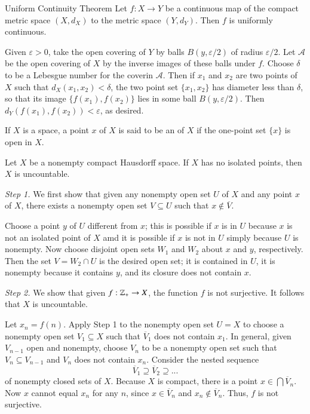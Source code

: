 \documentclass[12pt, a4paper, twoside, openright, titlepage]{book}
\begin{document}
\begin{namthm}{Uniform Continuity Theorem}{}
    Let $f:X\rightarrow Y$ be a continuous map of the compact metric space $(X,d_X)$ to the metric space $(Y,d_Y)$. Then $f$ is uniformly continuous.
\end{namthm}
\begin{proof*}{}{}
    Given $\varepsilon >0$, take the open covering of $Y$ by balls $B(y,\varepsilon/2)$ of radius $\varepsilon/2$. Let $\mathcal{A}$ be the open covering of $X$ by the inverse images of these balls under $f$. Choose $\delta$ to be a Lebesgue number for the coverin $\mathcal{A}$. Then if $x_1$ and $x_2$ are two points of $X$ such that $d_X(x_1,x_2) < \delta$, the two point set $\{x_1,x_2\}$ has diameter less than $\delta$, so that its image $\{f(x_1),f(x_2)\}$ lies in some ball $B(y,\varepsilon/2)$. Then $d_Y(f(x_1),f(x_2)) < \varepsilon$, as desired.
\end{proof*}

\begin{defn}{}{}
    If $X$ is a space, a point $x$ of $X$ is said to be an  of $X$ if the one-point set $\{x\}$ is open in $X$.
\end{defn}


\begin{thm}{}{}
    Let $X$ be a nonempty compact Hausdorff space. If $X$ has no isolated points, then $X$ is uncountable.
\end{thm}
\begin{proof*}{}{}
    \emph{Step 1.} We first show that given any nonempty open set $U$ of $X$ and any point $x$ of $X$, there exists a nonempty open set $V \subseteq U$ such that $x \notin \overline{V}$.

    Choose a point $y$ of $U$ different from $x$; this is possible if $x$ is in $U$ because $x$ is not an isolated point of $X$ amd it is possible if $x$ is not in $U$ simply because $U$ is nonempty. Now choose disjoint open sets $W_1$ and $W_2$ about $x$ and $y$, respectively. Then the set $V = W_2 \cap U$ is the desired open set; it is contained in $U$, it is nonempty because it contains $y$, and its closure does not contain $x$.

    \emph{Step 2.} We show that given $f:\mathbb Z_+\rightarrow X$, the function $f$ is not surjective. It follows that $X$ is uncountable.

    Let $x_n = f(n)$. Apply Step 1 to the nonempty open set $U = X$ to choose a nonempty open set $V_1 \subseteq X$ such that $\overline{V}_1$ does not contain $x_1$. In general, given $V_{n-1}$ open and nonempty, choose $V_n$ to be a nonempty open set such that $V_n \subseteq V_{n-1}$ and $V_n$ does not contain $x_n$. Consider the nested sequence \begin{equation*}
        \overline{V}_1\supseteq \overline{V}_2\supseteq ...
    \end{equation*}
    of nonempty closed sets of $X$. Because $X$ is compact, there is a point $x \in \bigcap\overline{V}_n$. Now $x$ cannot equal $x_n$ for any $n$, since $x \in \overline{V}_n$ and $x_n \notin \overline{V}_n$. Thus, $f$ is not surjective.
\end{proof*}
\end{document}
